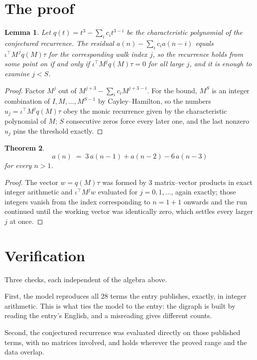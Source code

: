 \documentclass[11pt,a4paper]{article}
\theoremstyle{plain}
\newtheorem{theorem}{Theorem}
\newtheorem{lemma}[theorem]{Lemma}
\theoremstyle{definition}
\begin{document}
\section{The proof}

\begin{lemma}\label{lem:crit}
Let $q(t)=t^{3}-\sum_i c_it^{3-i}$ be the characteristic polynomial of the
conjectured recurrence. The residual $a(n)-\sum_ic_ia(n-i)$ equals
$\iota^{\!\top}M^{\,j}q(M)\tau$ for the corresponding walk index $j$, so the recurrence
holds from some point on if and only if $\iota^{\!\top}M^{j}q(M)\tau=0$ for all large $j$,
and it is enough to examine $j<S$.
\end{lemma}

\begin{proof}
Factor $M^{j}$ out of $M^{j+3}-\sum_ic_iM^{j+3-i}$. For the bound, $M^{S}$
is an integer combination of $I,M,\dots,M^{S-1}$ by Cayley--Hamilton, so the numbers
$u_j=\iota^{\!\top}M^{j}q(M)\tau$ obey the monic recurrence given by the characteristic
polynomial of $M$; $S$ consecutive zeros force every later one, and the last nonzero $u_j$
pins the threshold exactly.
\end{proof}

\begin{theorem}
\[
a(n)\;=\;3\,a(n-1) + a(n-2) - 6\,a(n-3)
\]
for every $n>1$.
\end{theorem}

\begin{proof}
The vector $w=q(M)\tau$ was formed by $3$ matrix--vector products in exact integer
arithmetic and $\iota^{\!\top}M^{j}w$ evaluated for $j=0,1,\dots$, again exactly; those
integers vanish from the index corresponding to $n=1+1$ onwards and the run continued
until the working vector was identically zero, which settles every larger $j$ at once.
\end{proof}

\section{Verification}

Three checks, each independent of the algebra above.

First, the model reproduces all $28$ terms the entry publishes, exactly, in integer
arithmetic. This is what ties the model to the entry: the digraph is built by reading the
entry's English, and a misreading gives different counts.

Second, the conjectured recurrence was evaluated directly on those published terms, with no
matrices involved, and holds wherever the proved range and the data overlap.
\end{document}
